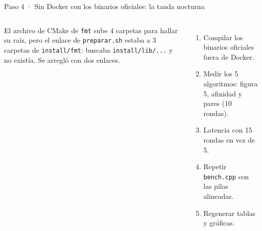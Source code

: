 \begin{frame}{Paso 4 · Sin Docker con los binarios oficiales: la tanda nocturna}
  \begin{columns}[T]
    \small
    El archivo de CMake de \texttt{fmt} sube 4 carpetas para hallar su raíz, pero el enlace de \texttt{preparar.sh} estaba a 3 carpetas de \texttt{install/fmt}: buscaba \texttt{install/lib/...} y no existía. Se arregló con dos enlaces.
    \par\medskip
    \begin{enumerate}\footnotesize
      \item Compilar los binarios oficiales fuera de Docker.
      \item Medir los 5 algoritmos: figura 5, afinidad y pares (10 rondas).
      \item Latencia con 15 rondas en vez de 5.
      \item Repetir \texttt{bench.cpp} con las pilas alineadas.
      \item Regenerar tablas y gráficas.
    \end{enumerate}
    \vspace{4mm}
    \par\bigskip\bigskip
  \end{columns}
\end{frame}

